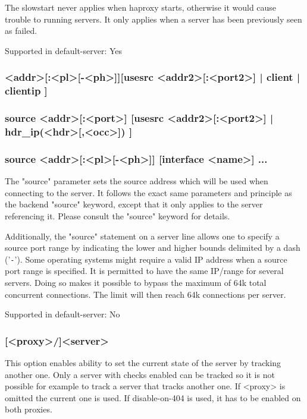   The slowstart never applies when haproxy starts, otherwise it would cause
  trouble to running servers. It only applies when a server has been previously
  seen as failed.

  Supported in default-server: Yes

\subsubsection[source]{ <addr>[:<pl>[-<ph>]][usesrc { <addr2>[:<port2>] | client | clientip } ]}
\subsubsection*{source <addr>[:<port>] [usesrc { <addr2>[:<port2>] | hdr\_ip(<hdr>[,<occ>]) } ]}
\subsubsection*{source <addr>[:<pl>[-<ph>]] [interface <name>] ... }

  The "source" parameter sets the source address which will be used when
  connecting to the server. It follows the exact same parameters and principle
  as the backend "source" keyword, except that it only applies to the server
  referencing it. Please consult the "source" keyword for details.

  Additionally, the "source" statement on a server line allows one to specify a
  source port range by indicating the lower and higher bounds delimited by a
  dash ('\verb|-|'). Some operating systems might require a valid IP address when a
  source port range is specified. It is permitted to have the same IP/range for
  several servers. Doing so makes it possible to bypass the maximum of 64k
  total concurrent connections. The limit will then reach 64k connections per
  server.

  Supported in default-server: No

\subsubsection[track]{ [<proxy>/]<server>}
  This option enables ability to set the current state of the server by
  tracking another one. Only a server with checks enabled can be tracked
  so it is not possible for example to track a server that tracks another
  one. If <proxy> is omitted the current one is used. If disable-on-404 is
  used, it has to be enabled on both proxies.

